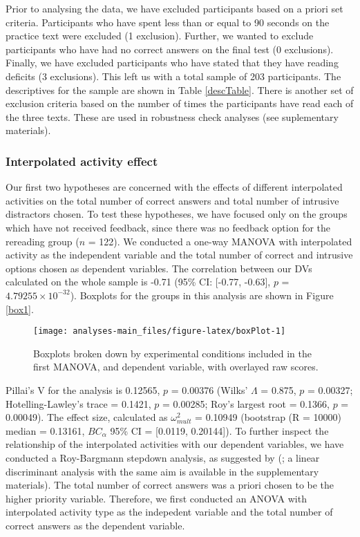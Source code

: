 \documentclass[11pt,]{article}
\begin{document}
Prior to analysing the data, we have excluded participants based on a
priori set criteria. Participants who have spent less than or equal to
90 seconds on the practice text were excluded (1 exclusion). Further, we
wanted to exclude participants who have had no correct answers on the
final test (0 exclusions). Finally, we have excluded participants who
have stated that they have reading deficits (3 exclusions). This left us
with a total sample of 203 participants. The descriptives for the sample
are shown in Table \ref{descTable}. There is another set of exclusion
criteria based on the number of times the participants have read each of
the three texts. These are used in robustness check analyses (see
suplementary materials).

\hypertarget{interpolated-activity-effect}{%
\subsubsection{Interpolated activity
effect}\label{interpolated-activity-effect}}

Our first two hypotheses are concerned with the effects of different
interpolated activities on the total number of correct answers and total
number of intrusive distractors chosen. To test these hypotheses, we
have focused only on the groups which have not received feedback, since
there was no feedback option for the rereading group (\(n\) = 122). We
conducted a one-way MANOVA with interpolated activity as the independent
variable and the total number of correct and intrusive options chosen as
dependent variables. The correlation between our DVs calculated on the
whole sample is -0.71 (95\% CI: {[}-0.77, -0.63{]}, \(p\) =
\(4.79255\times 10^{-32}\)). Boxplots for the groups in this analysis
are shown in Figure \ref{box1}.

\begin{figure*}[h]

{\centering \texttt{[image: analyses-main\_files/figure-latex/boxPlot-1]} 

}

\caption{\label{box1} Boxplots broken down by experimental conditions included in the first MANOVA, and dependent variable, with overlayed raw scores.}\label{fig:boxPlot}
\end{figure*}

Pillai's V for the analysis is 0.12565, \(p\) = 0.00376 (Wilks'
\(\Lambda\) = 0.875, \(p\) = 0.00327; Hotelling-Lawley's trace = 0.1421,
\(p\) = 0.00285; Roy's largest root = 0.1366, \(p\) = 0.00049). The
effect size, calculated as \(\omega^2_{mult}\) = 0.10949 (bootstrap (R =
10000) median = 0.13161, \(BC_\alpha\) 95\% CI = {[}0.0119, 0.20144{]}).
To further inspect the relationship of the interpolated activities with
our dependent variables, we have conducted a Roy-Bargmann stepdown
analysis, as suggested by \citeauthor{tabachnick_using_2012}
(\citeyear{tabachnick_using_2012}; a linear discriminant analysis with
the same aim is available in the supplementary materials). The total
number of correct answers was a priori chosen to be the higher priority
variable. Therefore, we first conducted an ANOVA with interpolated
activity type as the indepedent variable and the total number of correct
answers as the dependent variable.
\end{document}
